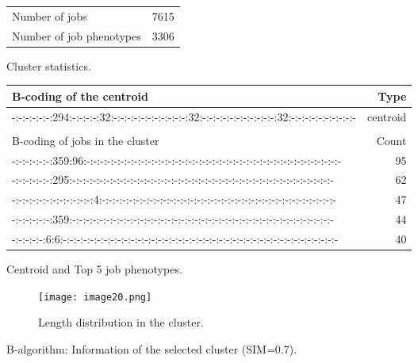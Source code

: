 \documentclass{jhps}
\begin{document}
\begin{figure}
	\begin{subtable}{\textwidth}
		\centering
		\begin{tabular}{lr}
			Number of jobs & 7615 \\
			Number of job phenotypes & 3306 \\
		\end{tabular}
		\caption{Cluster statistics.}
		\label{cluster:bin_all:stats}
	\end{subtable}
	\medskip
	\begin{subtable}{\textwidth}
		\centering
		\begin{tiny}
			\begin{tabular}{l|r}
				\rowcolor{tblhead}
				B-coding of the centroid                                                                    &  Type     \\
				\hline
				-:-:-:-:-:-:294:-:-:-:-:32:-:-:-:-:-:-:-:-:-:-:-:32:-:-:-:-:-:-:-:-:-:-:-:32:-:-:-:-:-:-:-:-:-:- &  centroid \\
				\multicolumn{2}{l}{}                                                                             \\
				\rowcolor{tblhead}
				B-coding of jobs in the cluster                                                             &  Count    \\
				\hline
				-:-:-:-:-:-:359:96:-:-:-:-:-:-:-:-:-:-:-:-:-:-:-:-:-:-:-:-:-:-:-:-:-:-:-:-:-:-:-:-:-:-:-:-:-:-   &  95       \\
				-:-:-:-:-:-:295:-:-:-:-:-:-:-:-:-:-:-:-:-:-:-:-:-:-:-:-:-:-:-:-:-:-:-:-:-:-:-:-:-:-:-:-:-:-:-    &  62       \\
				-:-:-:-:-:-:-:-:-:-:-:-:4:-:-:-:-:-:-:-:-:-:-:-:-:-:-:-:-:-:-:-:-:-:-:-:-:-:-:-:-:-:-:-:-:-:-:-  &  47       \\
				-:-:-:-:-:-:359:-:-:-:-:-:-:-:-:-:-:-:-:-:-:-:-:-:-:-:-:-:-:-:-:-:-:-:-:-:-:-:-:-:-:-:-:-:-:-    &  44       \\
				-:-:-:-:-:6:6:-:-:-:-:-:-:-:-:-:-:-:-:-:-:-:-:-:-:-:-:-:-:-:-:-:-:-:-:-:-:-:-:-:-:-:-:-:-:-:-:-  &  40       \\
			\end{tabular}
		\end{tiny}
		\caption{Centroid and Top 5 job phenotypes.}
		\label{cluster:bin_all:top_jobs}
	\end{subtable}
	\medskip
	\begin{subfigure}{\textwidth}
		\centering
		\texttt{[image: image20.png]}
		\caption{Length distribution in the cluster.}
		\label{cluster:bin_all:length}
	\end{subfigure}
	\caption{B-algorithm: Information of the selected cluster (SIM=0.7).}
	\label{cluster:bin_all}
\end{figure}
\end{document}
